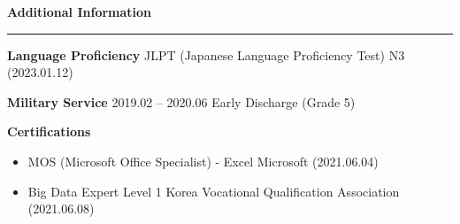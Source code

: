 \documentclass[a4paper, 10pt]{article}
\newcommand{\resumesection}[1]{%
  \vspace{8pt}
  \noindent
  {\large\bfseries #1}
  \vspace{2pt}
  \noindent\hrule
  \vspace{4pt}
}
\begin{document}
\newpage

\resumesection{Additional Information}

\vspace{3pt}
\noindent
\textbf{Language Proficiency} \hfill JLPT (Japanese Language Proficiency Test) N3 (2023.01.12)

\vspace{2pt}
\noindent
\textbf{Military Service} \hfill 2019.02 -- 2020.06 Early Discharge (Grade 5)

\vspace{2pt}
\noindent
\textbf{Certifications}

\begin{itemize}
  \setlength{\itemsep}{1pt}
  \setlength{\parskip}{0pt}
  \item MOS (Microsoft Office Specialist) - Excel \hfill Microsoft (2021.06.04)
  \item Big Data Expert Level 1 \hfill Korea Vocational Qualification Association (2021.06.08)
\end{itemize}
\end{document}
